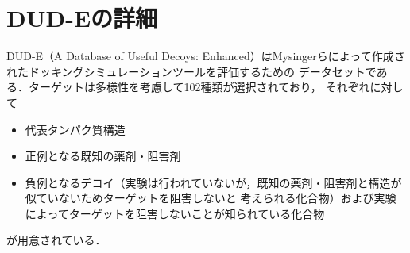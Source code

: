\appendix
\chapter{DUD-Eの詳細}\label{appendix:dude}
DUD-E（A Database of Useful Decoys: Enhanced）はMysingerらによって作成されたドッキングシミュレーションツールを評価するための
データセットである\cite{Mysinger2012}．ターゲットは多様性を考慮して102種類が選択されており，
それぞれに対して
\begin{itemize}
\item 代表タンパク質構造
\item 正例となる既知の薬剤・阻害剤
\item 負例となるデコイ（実験は行われていないが，既知の薬剤・阻害剤と構造が似ていないためターゲットを阻害しないと
	考えられる化合物）および実験によってターゲットを阻害しないことが知られている化合物
\end{itemize}
が用意されている．

\newpage

